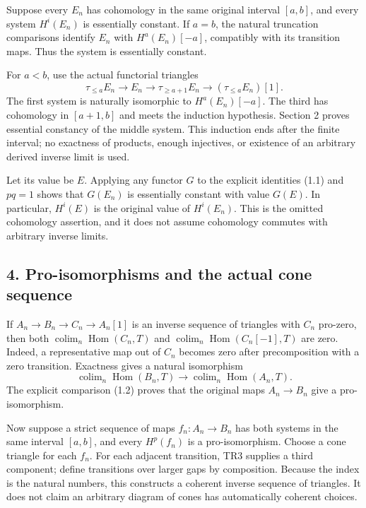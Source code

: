 Suppose every \(E_n\) has cohomology in the same original interval \([a,b]\),\allowbreak{} and every system \(H^i(E_n)\) is essentially constant. If \(a=b\),\allowbreak{} the natural truncation comparisons identify \(E_n\) with \(H^a(E_n)[-a]\),\allowbreak{} compatibly with its transition maps. Thus the system is essentially constant.

For \(a<b\),\allowbreak{} use the actual functorial triangles \[
\tau_{\leq a}E_n\longrightarrow E_n\longrightarrow
\tau_{\geq a+1}E_n\longrightarrow(\tau_{\leq a}E_n)[1].
\] The first system is naturally isomorphic to \(H^a(E_n)[-a]\). The third has cohomology in \([a+1,b]\) and meets the induction hypothesis. Section 2 proves essential constancy of the middle system. This induction ends after the finite interval; no exactness of products,\allowbreak{} enough injectives,\allowbreak{} or existence of an arbitrary derived inverse limit is used.

Let its value be \(E\). Applying any functor \(G\) to the explicit identities (1.1)\allowbreak{} and \(pq=1\) shows that \(G(E_n)\) is essentially constant with value \(G(E)\). In particular,\allowbreak{} \(H^i(E)\) is the original value of \(H^i(E_n)\). This is the omitted cohomology assertion,\allowbreak{} and it does not assume cohomology commutes with arbitrary inverse limits.

\subsection{4. Pro-isomorphisms and the actual cone sequence}\label{proofs-12380-12604-pro-isomorphisms-and-the-actual-cone-sequence}

If \(A_n\to B_n\to C_n\to A_n[1]\) is an inverse sequence of triangles with \(C_n\) pro-zero,\allowbreak{} then both \(\operatorname{colim}_n\operatorname{Hom}(C_n,T)\) and \(\operatorname{colim}_n\operatorname{Hom}(C_n[-1],T)\) are zero. Indeed,\allowbreak{} a representative map out of \(C_n\) becomes zero after precomposition with a zero transition. Exactness gives a natural isomorphism \[
\operatorname{colim}_n\operatorname{Hom}(B_n,T)
 \longrightarrow\operatorname{colim}_n\operatorname{Hom}(A_n,T).
\] The explicit comparison (1.2)\allowbreak{} proves that the original maps \(A_n\to B_n\) give a pro-isomorphism.

Now suppose a strict sequence of maps \(f_n:A_n\to B_n\) has both systems in the same interval \([a,b]\),\allowbreak{} and every \(H^p(f_n)\) is a pro-isomorphism. Choose a cone triangle for each \(f_n\). For each adjacent transition,\allowbreak{} TR3 supplies a third component; define transitions over larger gaps by composition. Because the index is the natural numbers,\allowbreak{} this constructs a coherent inverse sequence of triangles. It does not claim an arbitrary diagram of cones has automatically coherent choices.

